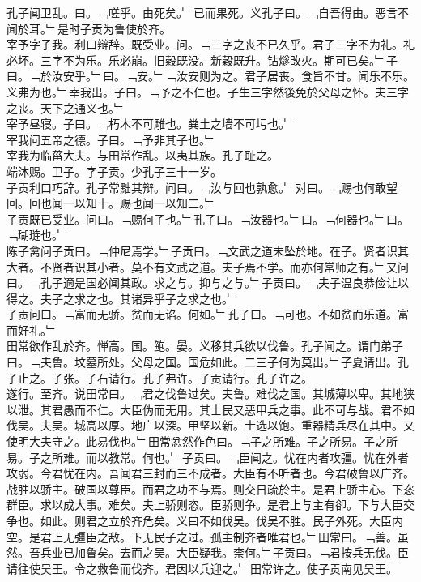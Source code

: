 \documentclass{zhvt-classic}
\begin{document}
\hspace*{2em}孔子闻卫乱。曰。﹁嗟乎。由死矣。﹂已而果死。义孔子曰。﹁自吾得由。恶言不闻於耳。﹂是时子贡为鲁使於齐。\\
\hspace*{2em}宰予字子我。利口辩辞。既受业。问。﹁三字之丧不已久乎。君子三字不为礼。礼必坏。三字不为乐。乐必崩。旧穀既没。新穀既升。钻燧改火。期可已矣。﹂子曰。﹁於汝安乎。﹂曰。﹁安。﹂﹁汝安则为之。君子居丧。食旨不甘。闻乐不乐。义弗为也。﹂宰我出。子曰。﹁予之不仁也。子生三字然後免於父母之怀。夫三字之丧。天下之通义也。﹂\\
\hspace*{2em}宰予昼寝。子曰。﹁朽木不可雕也。粪土之墙不可圬也。﹂\\
\hspace*{2em}宰我问五帝之德。子曰。﹁予非其子也。﹂\\
\hspace*{2em}宰我为临菑大夫。与田常作乱。以夷其族。孔子耻之。\\
\hspace*{2em}端沐赐。卫子。字子贡。少孔子三十一岁。\\
\hspace*{2em}子贡利口巧辞。孔子常黜其辩。问曰。﹁汝与回也孰愈。﹂对曰。﹁赐也何敢望回。回也闻一以知十。赐也闻一以知二。﹂\\
\hspace*{2em}子贡既已受业。问曰。﹁赐何子也。﹂孔子曰。﹁汝器也。﹂曰。﹁何器也。﹂曰。﹁瑚琏也。﹂\\
\hspace*{2em}陈子禽问子贡曰。﹁仲尼焉学。﹂子贡曰。﹁文武之道未坠於地。在子。贤者识其大者。不贤者识其小者。莫不有文武之道。夫子焉不学。而亦何常师之有。﹂又问曰。﹁孔子適是国必闻其政。求之与。抑与之与。﹂子贡曰。﹁夫子温良恭俭让以得之。夫子之求之也。其诸异乎子之求之也。﹂\\
\hspace*{2em}子贡问曰。﹁富而无骄。贫而无谄。何如。﹂孔子曰。﹁可也。不如贫而乐道。富而好礼。﹂\\
\hspace*{2em}田常欲作乱於齐。惮高。国。鲍。晏。义移其兵欲以伐鲁。孔子闻之。谓门弟子曰。﹁夫鲁。坟墓所处。父母之国。国危如此。二三子何为莫出。﹂子夏请出。孔子止之。子张。子石请行。孔子弗许。子贡请行。孔子许之。\\
\hspace*{2em}遂行。至齐。说田常曰。﹁君之伐鲁过矣。夫鲁。难伐之国。其城薄以卑。其地狭以泄。其君愚而不仁。大臣伪而无用。其士民又恶甲兵之事。此不可与战。君不如伐吴。夫吴。城高以厚。地广以深。甲坚以新。士选以饱。重器精兵尽在其中。又使明大夫守之。此易伐也。﹂田常忿然作色曰。﹁子之所难。子之所易。子之所易。子之所难。而以教常。何也。﹂子贡曰。﹁臣闻之。忧在内者攻彊。忧在外者攻弱。今君忧在内。吾闻君三封而三不成者。大臣有不听者也。今君破鲁以广齐。战胜以骄主。破国以尊臣。而君之功不与焉。则交日疏於主。是君上骄主心。下恣群臣。求以成大事。难矣。夫上骄则恣。臣骄则争。是君上与主有卻。下与大臣交争也。如此。则君之立於齐危矣。义曰不如伐吴。伐吴不胜。民子外死。大臣内空。是君上无彊臣之敌。下无民子之过。孤主制齐者唯君也。﹂田常曰。﹁善。虽然。吾兵业已加鲁矣。去而之吴。大臣疑我。柰何。﹂子贡曰。﹁君按兵无伐。臣请往使吴王。令之救鲁而伐齐。君因以兵迎之。﹂田常许之。使子贡南见吴王。\\
\end{document}
